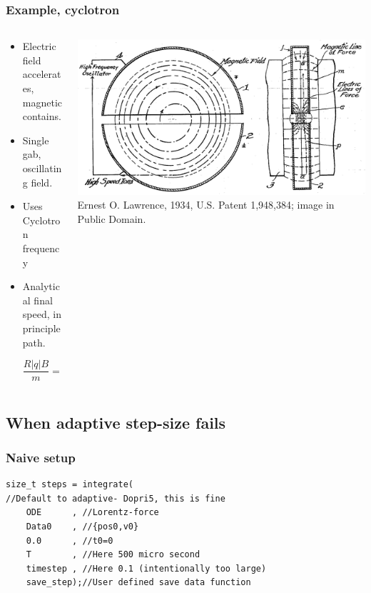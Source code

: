 \documentclass{beamer}
\begin{document}
\begin{frame}
\frametitle{Example, cyclotron}
\begin{columns}
\begin{column}{0.5\linewidth}
\begin{itemize}
\item<1-> Electric field accelerates, magnetic contains.

\item<2-> Single gab, oscillating field.

\item<3-> Uses Cyclotron frequency

\item<4-> Analytical final speed, in principle path.

\begin{equation*}
\frac{R|q|B}{m} = v_\perp
\end{equation*}

\end{itemize}
\end{column}
\begin{column}{0.5\linewidth}
\includegraphics[width=\linewidth]{ Cyclotron_patent.png}
{\color{gray} Ernest O. Lawrence, 1934, U.S. Patent 1,948,384; image in Public Domain.}
\end{column}
\end{columns}
\end{frame}

\subsection{When adaptive step-size fails}

\begin{frame}[fragile]
\frametitle{Naive setup}
\begin{lstlisting}
size_t steps = integrate(
//Default to adaptive- Dopri5, this is fine
    ODE      , //Lorentz-force
    Data0    , //{pos0,v0}
    0.0      , //t0=0
    T        , //Here 500 micro second
    timestep , //Here 0.1 (intentionally too large)
    save_step);//User defined save data function
\end{lstlisting}
\end{frame}
\end{document}
